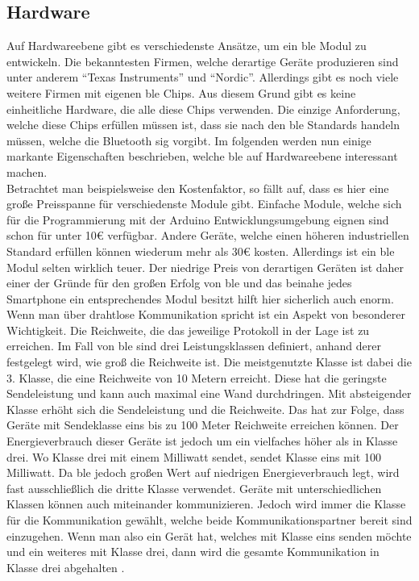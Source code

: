 \subsection{Hardware}
\label{ss:grundlagen:hardware}

Auf Hardwareebene gibt es verschiedenste Ansätze, um ein \ac{ble} Modul zu entwickeln. Die bekanntesten Firmen, welche derartige Geräte produzieren sind unter anderem "`Texas Instruments"' und "`Nordic"'. Allerdings gibt es noch viele weitere Firmen mit eigenen \ac{ble} Chips. Aus diesem Grund gibt es keine einheitliche Hardware, die alle diese Chips verwenden. Die einzige Anforderung, welche diese Chips erfüllen müssen ist, dass sie nach den \ac{ble} Standards handeln müssen, welche die Bluetooth \ac{sig} vorgibt. Im folgenden werden nun einige markante Eigenschaften beschrieben, welche \ac{ble} auf Hardwareebene interessant machen.\\

\noindent Betrachtet man beispielsweise den Kostenfaktor, so fällt auf, dass es hier eine große Preisspanne für verschiedenste Module gibt. Einfache Module, welche sich für die Programmierung mit der Arduino Entwicklungsumgebung eignen sind schon für unter 10€ verfügbar. Andere Geräte, welche einen höheren industriellen Standard erfüllen können wiederum mehr als 30€ kosten. Allerdings ist ein \ac{ble} Modul selten wirklich teuer. Der niedrige Preis von derartigen Geräten ist daher einer der Gründe für den großen Erfolg von \ac{ble} und das beinahe jedes Smartphone ein entsprechendes Modul besitzt hilft hier sicherlich auch enorm.\\

\noindent Wenn man über drahtlose Kommunikation spricht ist ein Aspekt von besonderer Wichtigkeit. Die Reichweite, die das jeweilige Protokoll in der Lage ist zu erreichen. Im Fall von \ac{ble} sind drei Leistungsklassen definiert, anhand derer festgelegt wird, wie groß die Reichweite ist. Die meistgenutzte Klasse ist dabei die 3. Klasse, die eine Reichweite von 10 Metern erreicht. Diese hat die geringste Sendeleistung und kann auch maximal eine Wand durchdringen. Mit absteigender Klasse erhöht sich die Sendeleistung und die Reichweite. Das hat zur Folge, dass Geräte mit Sendeklasse eins bis zu 100 Meter Reichweite erreichen können. Der Energieverbrauch dieser Geräte ist jedoch um ein vielfaches höher als in Klasse drei. Wo Klasse drei mit einem Milliwatt sendet, sendet Klasse eins mit 100 Milliwatt. Da \ac{ble} jedoch großen Wert auf niedrigen Energieverbrauch legt, wird fast ausschließlich die dritte Klasse verwendet. Geräte mit unterschiedlichen Klassen können auch miteinander kommunizieren. Jedoch wird immer die Klasse für die Kommunikation gewählt, welche beide Kommunikationspartner bereit sind einzugehen. Wenn man also ein Gerät hat, welches mit Klasse eins senden möchte und ein weiteres mit Klasse drei, dann wird die gesamte Kommunikation in Klasse drei abgehalten \cite[Seite 411]{Sauter18:GMK}.\\ 

